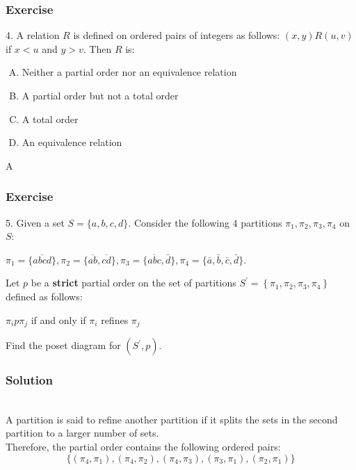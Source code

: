 \documentclass{beamer}
\begin{document}
\begin{frame}
    \frametitle{Exercise}
    4.  A relation $R$ is defined on ordered pairs of integers as follows: $(x,y) R(u,v)$ if $x < u$ and $y > v$. Then $R$ is:
    \begin{enumerate}[(A)]
        \item Neither a partial order nor an equivalence relation
        \item A partial order but not a total order
        \item A total order
        \item An equivalence relation
    \end{enumerate}
    \vs{2em}
     A
\end{frame}
\begin{frame}
    \frametitle{Exercise}
    5. Given a set $S=\{a, b, c, d\} .$ Consider the following 4 partitions 
    $\pi_{1}, \pi_{2}, \pi_{3}, \pi_{4}$ on $S$: 
    \begin{center}
        $\pi_{1}=\{\overline{a b c d}\}, \pi_{2}=\{\overline{a b}, \overline{c d}\}, \pi_{3}=\{\overline{a b c}, \bar{d}\}, \pi_{4}=\{\bar{a}, \bar{b}, \bar{c}, \bar{d}\} .$ \\
    \end{center}
    \hh Let $p$ be a \textbf{strict} partial order on the set of partitions $S^{\prime}=\left\{\pi_{1}, \pi_{2}, \pi_{3}, \pi_{4}\right\}$ defined as follows: 
    \begin{center}
        $\pi_{i} p \pi_{j}$ if and only if $\pi_{i}$ refines $\pi_{j}$\\ 
    \end{center}
    \hh Find the poset diagram for $\left(S^{\prime}, p\right)$. 
\end{frame}
\begin{frame}
    \frametitle{Solution}
        \\\hh A partition is said to refine another partition if it splits the sets 
        in the second partition to a larger number of sets.
        \\\hh Therefore, the partial order contains the following ordered pairs: 
        $$\{(\pi_4,\pi_1),(\pi_4,\pi_2),(\pi_4,\pi_3),(\pi_3,\pi_1),(\pi_2,\pi_1)\}$$        
\end{frame}
\end{document}
